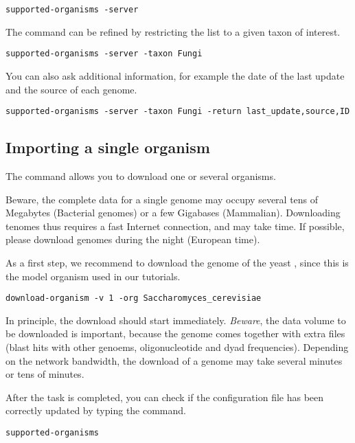 \begin{lstlisting}
supported-organisms -server
\end{lstlisting}

The command can be refined by restricting the list to a given taxon of
interest.

\begin{lstlisting}
supported-organisms -server -taxon Fungi
\end{lstlisting}

You can also ask additional information, for example the date of the
last update and the source of each genome.

\begin{lstlisting}
supported-organisms -server -taxon Fungi -return last_update,source,ID
\end{lstlisting}


\subsection{Importing a single organism}


The command  allows you to download one or
several organisms. 

Beware, the complete data for a single genome may occupy several tens
of Megabytes (Bacterial genomes) or a few Gigabases
(Mammalian). Downloading tenomes thus requires a fast Internet
connection, and may take time. If possible, please download genomes
during the night (European time).

As a first step, we recommend to download the genome of the yeast
, since this is the model organism used
in our tutorials.


\begin{lstlisting}
download-organism -v 1 -org Saccharomyces_cerevisiae
\end{lstlisting}

In principle, the download should start immediately. \emph{Beware},
the data volume to be downloaded is important, because the genome
comes together with extra files (blast hits with other genoems,
oligonucleotide and dyad frequencies). Depending on the network
bandwidth, the download of a genome may take several minutes or tens
of minutes. 

After the task is completed, you can check if the configuration file
has been correctly updated by typing the command.

\begin{lstlisting}
supported-organisms
\end{lstlisting}


